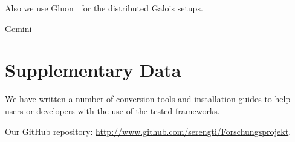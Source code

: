 \documentclass[conference,a4paper]{IEEEtran}
\begin{document}
Also we use Gluon~\cite{vertGalois} for the distributed Galois setups.

Gemini~\cite{Gemini}


\section*{Supplementary Data}\label{supplementaryData}
We have written a number of conversion tools and installation guides to help
users or developers with the use of the tested frameworks.


Our GitHub repository: \url{http://www.github.com/serengti/Forschungsprojekt}.








% 
% 


\end{document}
